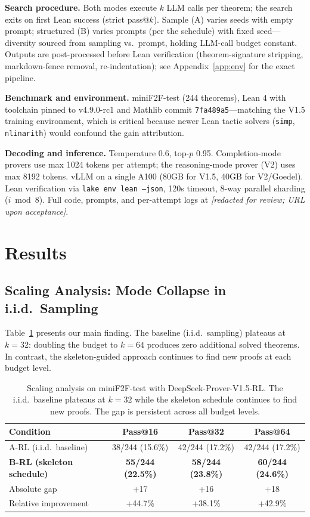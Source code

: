 \documentclass{article}
\begin{document}
\textbf{Search procedure.} Both modes execute $k$ LLM calls per theorem; the search exits on first Lean success (strict pass@$k$). Sample (A) varies seeds with empty prompt; structured (B) varies prompts (per the schedule) with fixed seed---diversity sourced from sampling vs.\ prompt, holding LLM-call budget constant. Outputs are post-processed before Lean verification (theorem-signature stripping, markdown-fence removal, re-indentation); see Appendix~\ref{app:env} for the exact pipeline.

\textbf{Benchmark and environment.} miniF2F-test (244 theorems), Lean 4 with toolchain pinned to v4.9.0-rc1 and Mathlib commit \texttt{7fa489a5}---matching the V1.5 training environment, which is critical because newer Lean tactic solvers (\texttt{simp}, \texttt{nlinarith}) would confound the gain attribution.

\textbf{Decoding and inference.} Temperature 0.6, top-$p$ 0.95. Completion-mode provers use max 1024 tokens per attempt; the reasoning-mode prover (V2) uses max 8192 tokens. vLLM on a single A100 (80GB for V1.5, 40GB for V2/Goedel). Lean verification via \texttt{lake env lean --json}, 120s timeout, 8-way parallel sharding ($i \bmod 8$). Full code, prompts, and per-attempt logs at \emph{[redacted for review; URL upon acceptance]}.


\section{Results}

\subsection{Scaling Analysis: Mode Collapse in i.i.d.\ Sampling}
\label{sec:scaling}

Table~\ref{tab:scaling} presents our main finding. The baseline (i.i.d.\ sampling) plateaus at $k{=}32$: doubling the budget to $k{=}64$ produces zero additional solved theorems. In contrast, the skeleton-guided approach continues to find new proofs at each budget level.

\begin{table}[h]
\centering
\begin{tabular}{lccc}
\toprule
\textbf{Condition} & \textbf{Pass@16} & \textbf{Pass@32} & \textbf{Pass@64} \\
\midrule
A-RL (i.i.d.\ baseline) & 38/244 (15.6\%) & 42/244 (17.2\%) & 42/244 (17.2\%) \\
\textbf{B-RL (skeleton schedule)} & \textbf{55/244 (22.5\%)} & \textbf{58/244 (23.8\%)} & \textbf{60/244 (24.6\%)} \\
\midrule
Absolute gap & +17 & +16 & +18 \\
Relative improvement & +44.7\% & +38.1\% & +42.9\% \\
\bottomrule
\end{tabular}
\caption{Scaling analysis on miniF2F-test with DeepSeek-Prover-V1.5-RL. The i.i.d.\ baseline plateaus at $k{=}32$ while the skeleton schedule continues to find new proofs. The gap is persistent across all budget levels.}
\label{tab:scaling}
\end{table}
\end{document}
